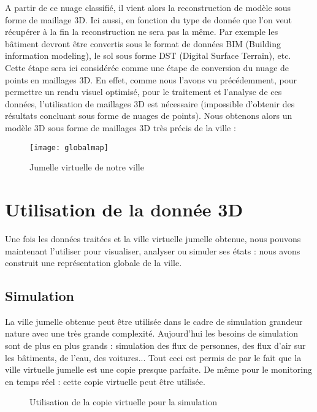 A partir de ce nuage classifié, il vient alors la reconstruction de modèle sous forme de maillage 3D. Ici aussi, en fonction du type de donnée que l'on veut récupérer à la fin la reconstruction ne sera pas la même. Par exemple les bâtiment devront être convertis sous le format de données BIM (Building information modeling), le sol sous forme DST (Digital Surface Terrain), etc. Cette étape sera ici considérée comme une étape de conversion du nuage de points en maillages 3D. En effet, comme nous l'avons vu précédemment, pour permettre un rendu visuel optimisé, pour le traitement et l'analyse de ces données, l'utilisation de maillages 3D est nécessaire (impossible d'obtenir des résultats concluant sous forme de nuages de points).
Nous obtenons alors un modèle 3D sous forme de maillages 3D très précis de la ville :

\begin{figure}[h]
    \centering
    \texttt{[image: globalmap]}
    \caption{Jumelle virtuelle de notre ville}
    \label{fig:sol}
\end{figure}
\FloatBarrier

\section{Utilisation de la donnée 3D}

Une fois les données traitées et la ville virtuelle jumelle obtenue, nous pouvons maintenant l'utiliser pour visualiser, analyser ou simuler ses états : nous avons construit une représentation globale de la ville.

\subsection{Simulation}
La ville jumelle obtenue peut être utilisée dans le cadre de simulation grandeur nature avec une très grande complexité. Aujourd'hui les besoins de simulation sont de plus en plus grands : simulation des flux de personnes, des flux d'air sur les bâtiments, de l'eau, des voitures... Tout ceci est permis de par le fait que la ville virtuelle jumelle est une copie presque parfaite. De même pour le monitoring en temps réel : cette copie virtuelle peut être utilisée.

\begin{figure}[h]
    \centering
    \qquad
    \caption{Utilisation de la copie virtuelle pour la simulation}
    \label{fig:Ud}
\end{figure}
\FloatBarrier


